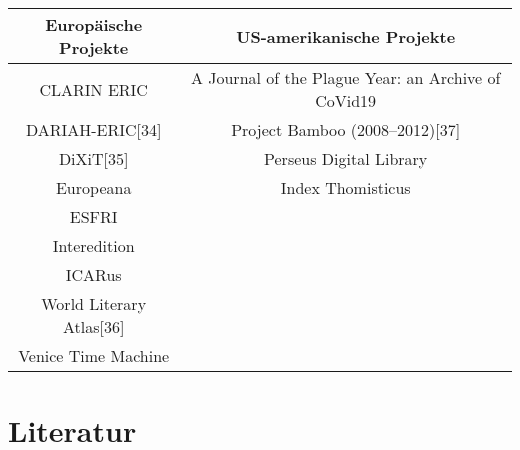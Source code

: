 \documentclass{article}
\begin{document}
\begin{tabular}{c|c}
    Europäische Projekte & US-amerikanische Projekte \\
    \hline
    CLARIN ERIC & A Journal of the Plague Year: an Archive of CoVid19\\
    DARIAH-ERIC[34] &  Project Bamboo (2008–2012)[37]\\
    DiXiT[35] &  Perseus Digital Library\\
    Europeana &  Index Thomisticus\\
    ESFRI  &  \\
    Interedition   &  \\
    ICARus    &  \\
    World Literary Atlas[36]   &  \\
    Venice Time Machine   &  \\
\end{tabular}

\section{Literatur}
\end{document}
